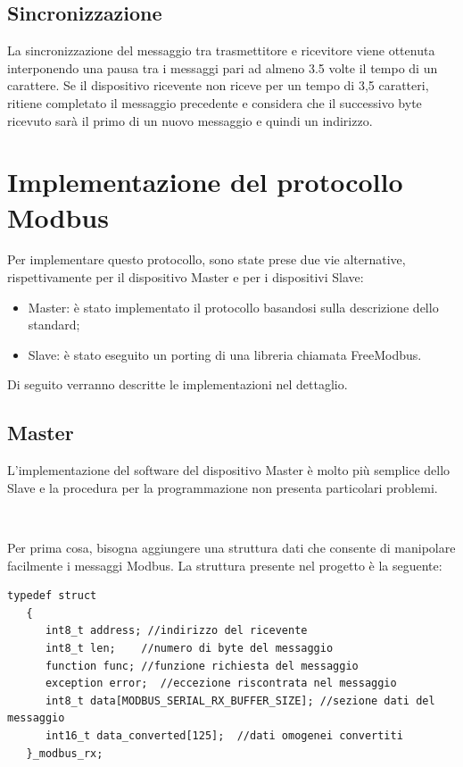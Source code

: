 \documentclass[a4paper,titlepage]{book}
\begin{document}
\subsection{Sincronizzazione}
La sincronizzazione del messaggio tra trasmettitore e ricevitore viene ottenuta interponendo una pausa tra i messaggi pari ad almeno 3.5 volte il tempo di un carattere. Se il dispositivo ricevente non riceve per un tempo di 3,5 caratteri, ritiene completato il messaggio precedente e considera che il successivo byte ricevuto sarà il primo di un nuovo messaggio e quindi un indirizzo.


\section{Implementazione del protocollo Modbus}

Per implementare questo protocollo, sono state prese due vie alternative, rispettivamente per il dispositivo Master e per i dispositivi Slave:

\begin{itemize}[noitemsep,topsep=15pt,parsep=10pt,partopsep=0pt]

\item Master: è stato implementato il protocollo basandosi sulla descrizione dello standard;
\item Slave: è stato eseguito un porting di una libreria chiamata FreeModbus.

\end{itemize}

Di seguito verranno descritte le implementazioni nel dettaglio.

\subsection{Master}

L'implementazione del software del dispositivo Master è molto più semplice dello Slave e la procedura per la programmazione non presenta particolari problemi.

~

Per prima cosa, bisogna aggiungere una struttura dati che consente di manipolare facilmente i messaggi Modbus. La struttura presente nel progetto è la seguente:

\begin{lstlisting}[showlines=false]
typedef struct
   {
      int8_t address; //indirizzo del ricevente
      int8_t len;    //numero di byte del messaggio
      function func; //funzione richiesta del messaggio
      exception error;  //eccezione riscontrata nel messaggio
      int8_t data[MODBUS_SERIAL_RX_BUFFER_SIZE]; //sezione dati del messaggio
      int16_t data_converted[125];  //dati omogenei convertiti
   }_modbus_rx;
\end{lstlisting}
\end{document}
